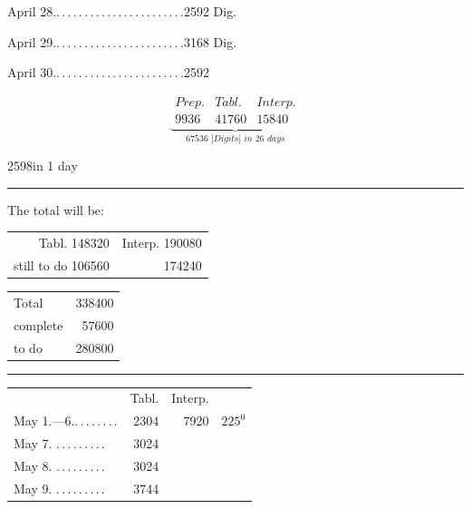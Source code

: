 \noindent{} April 28.\nobreak\hspace{.2em}\mbox{.\,.\,.\,.\,.\,.\,.\,.\,.\,.\,.\,.\,.\,.\,.\,.\,.\,.\,.\,.\,.\,.\,.}\hfill 2592 Dig.\par
\noindent{} April 29.\nobreak\hspace{.2em}\mbox{.\,.\,.\,.\,.\,.\,.\,.\,.\,.\,.\,.\,.\,.\,.\,.\,.\,.\,.\,.\,.\,.\,.}\hfill 3168 Dig.\par
\noindent{} April 30.\nobreak\hspace{.2em}\mbox{.\,.\,.\,.\,.\,.\,.\,.\,.\,.\,.\,.\,.\,.\,.\,.\,.\,.\,.\,.\,.\,.\,.}\hfill 2592\par
\[
\underbrace{\begin{array}{ccc}
\textit{Prep.}&\textit{Tabl.}&\textit{Interp.}\\
\mathit{9936}&\mathit{41760}&\mathit{15840}
\end{array}}_{\textstyle\textit{67536 [Digits] in 26 days}}
\]
\begin{center}2598\qquad in 1 day\par\smallskip\rule{.25\linewidth}{.3pt}\end{center}
\noindent The total will be:
\begin{center}
\begin{tabular}{@{}rr@{}}
Tabl. 148320&Interp. 190080\\
still to do 106560&174240
\end{tabular}\par\smallskip
\begin{tabular}{@{}lr@{}}
Total&338400\\
complete&57600\\
to do&280800
\end{tabular}\par\smallskip\rule{.25\linewidth}{.3pt}
\end{center}
\begin{center}
\begin{tabular}{@{}p{.36\linewidth}rrl@{}}
&Tabl.&Interp.&\\
May 1.—6.\nobreak\hspace{.2em}\mbox{.\,.\,.\,.\,.\,.\,.\,.}\hfill&2304&7920&\(\mathit{225}^0\)\\
May 7. \BJournalDay{♃}\nobreak\hspace{.2em}\mbox{.\,.\,.\,.\,.\,.\,.\,.\,.}\hfill&3024&&\\
May 8. \BJournalDay{♀}\nobreak\hspace{.2em}\mbox{.\,.\,.\,.\,.\,.\,.\,.\,.}\hfill&3024&&\\
May 9. \BJournalDay{♄}\nobreak\hspace{.2em}\mbox{.\,.\,.\,.\,.\,.\,.\,.\,.}\hfill&3744&&
\end{tabular}
\end{center}

